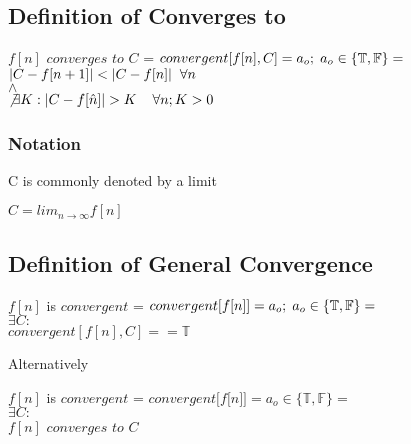 \documentclass[11pt]{article}
\begin{document}
\subsection{Definition of Converges to}
\begin{center}
\vspace{1mm}
$f[n]$ $converges$ $to$ $C$ = $convergent [f [n],C] = a_o; \hspace{1mm} a_o \in \{\mathbb{T},\mathbb{F}\} =$
\\ \vspace{6mm}
$
|C - f[n+1]| < |C - f[n]| \hspace{2mm} \forall n
$
\\ \vspace{2mm}
$
\land
$
\\ \vspace{2mm}
$
\not \exists K : | C - f[\hat{n}] | > K \hspace{4mm} \forall n; K > 0
$
\end{center}

\subsubsection{Notation}
C is commonly denoted by a limit
\begin{center}
$
C = lim_{n \rightarrow \infty} f[n]
$
\end{center}



\subsection{Definition of General Convergence}
\begin{center}
\vspace{1mm}
$f[n]$ is $convergent$ = $convergent \lbrack f \lbrack n \rbrack \rbrack = a_o; \hspace{1mm} a_o \in \{\mathbb{T},\mathbb{F}\} =$
\\ \vspace{6mm}
$
\exists C :
$
\\ \vspace{2mm}
$convergent[f[n],C] == \mathbb{T}$
\end{center}
Alternatively
\begin{center}
\vspace{1mm}
$f[n]$ is $convergent$ = $convergent \lbrack f \lbrack n \rbrack \rbrack = a_o \in \{\mathbb{T},\mathbb{F}\} =$
\\ \vspace{2mm}
$
\exists C :
$
\\ \vspace{2mm}
$f[n]$ $converges$ $to$ $C$
\end{center}
\end{document}

